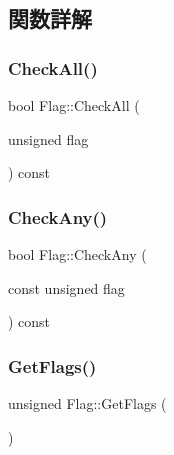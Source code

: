 \subsection{関数詳解}
\mbox{\label{class_flag_ac2ff8a3589aeefcf2672304da6339351}} 
\subsubsection{\texorpdfstring{Check\+All()}{CheckAll()}}
{\footnotesize\ttfamily bool Flag\+::\+Check\+All (\begin{DoxyParamCaption}\item[{unsigned}]{flag }\end{DoxyParamCaption}) const\hspace{0.3cm}{\ttfamily [inline]}}

\mbox{\label{class_flag_a3efc58733cf4aae0ff1ab0752aa4c702}} 
\subsubsection{\texorpdfstring{Check\+Any()}{CheckAny()}}
{\footnotesize\ttfamily bool Flag\+::\+Check\+Any (\begin{DoxyParamCaption}\item[{const unsigned}]{flag }\end{DoxyParamCaption}) const\hspace{0.3cm}{\ttfamily [inline]}}

\mbox{\label{class_flag_a0a2b25c70f1a7d90cd90c595b37ffc2a}} 
\subsubsection{\texorpdfstring{Get\+Flags()}{GetFlags()}}
{\footnotesize\ttfamily unsigned Flag\+::\+Get\+Flags (\begin{DoxyParamCaption}{ }\end{DoxyParamCaption})\hspace{0.3cm}{\ttfamily [inline]}}

\mbox{\label{class_flag_a69ac5240829e3f509c64ca28b2344b6d}} 
